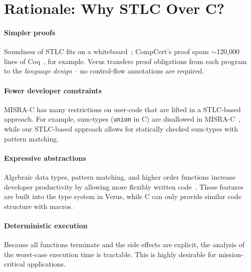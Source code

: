 \documentclass[conference]{IEEEtran}
\begin{document}
\section{Rationale: Why STLC Over C?}

\paragraph{Simpler proofs}
Soundness of STLC fits on a whiteboard~\cite{pierce2002}; CompCert's proof spans \(\sim\)120,000 lines of Coq~\cite{leroy2006}, for example.  Verus transfers proof obligations from each program to the \emph{language design} -- no control-flow annotations are required.

\paragraph{Fewer developer constraints}
MISRA-C has many restrictions on user-code that are lifted in a STLC-based approach. For example, sum-types (\verb|union| in C) are disallowed in MISRA-C~\cite{MISRA2004}, while our STLC-based approach allows for statically checked sum-types with pattern matching.

\paragraph{Expressive abstractions}
Algebraic data types, pattern matching, and higher order functions increase developer productivity by allowing more flexibly written code~\cite{hughes1989}. These features are built into the type system in Verus, while C can only provide similar code structure with macros. 

\paragraph{Deterministic execution}
Because all functions terminate and the side effects are explicit, the analysis of the worst-case execution time is tractable. This is highly desirable for mission-critical applications.
\end{document}
